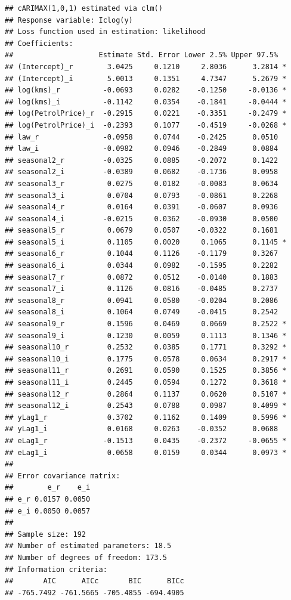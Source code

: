 \documentclass[
]{book}
\begin{document}
\begin{verbatim}
## cARIMAX(1,0,1) estimated via clm()
## Response variable: Iclog(y)
## Loss function used in estimation: likelihood
## Coefficients:
##                    Estimate Std. Error Lower 2.5% Upper 97.5%  
## (Intercept)_r        3.0425     0.1210     2.8036      3.2814 *
## (Intercept)_i        5.0013     0.1351     4.7347      5.2679 *
## log(kms)_r          -0.0693     0.0282    -0.1250     -0.0136 *
## log(kms)_i          -0.1142     0.0354    -0.1841     -0.0444 *
## log(PetrolPrice)_r  -0.2915     0.0221    -0.3351     -0.2479 *
## log(PetrolPrice)_i  -0.2393     0.1077    -0.4519     -0.0268 *
## law_r               -0.0958     0.0744    -0.2425      0.0510  
## law_i               -0.0982     0.0946    -0.2849      0.0884  
## seasonal2_r         -0.0325     0.0885    -0.2072      0.1422  
## seasonal2_i         -0.0389     0.0682    -0.1736      0.0958  
## seasonal3_r          0.0275     0.0182    -0.0083      0.0634  
## seasonal3_i          0.0704     0.0793    -0.0861      0.2268  
## seasonal4_r          0.0164     0.0391    -0.0607      0.0936  
## seasonal4_i         -0.0215     0.0362    -0.0930      0.0500  
## seasonal5_r          0.0679     0.0507    -0.0322      0.1681  
## seasonal5_i          0.1105     0.0020     0.1065      0.1145 *
## seasonal6_r          0.1044     0.1126    -0.1179      0.3267  
## seasonal6_i          0.0344     0.0982    -0.1595      0.2282  
## seasonal7_r          0.0872     0.0512    -0.0140      0.1883  
## seasonal7_i          0.1126     0.0816    -0.0485      0.2737  
## seasonal8_r          0.0941     0.0580    -0.0204      0.2086  
## seasonal8_i          0.1064     0.0749    -0.0415      0.2542  
## seasonal9_r          0.1596     0.0469     0.0669      0.2522 *
## seasonal9_i          0.1230     0.0059     0.1113      0.1346 *
## seasonal10_r         0.2532     0.0385     0.1771      0.3292 *
## seasonal10_i         0.1775     0.0578     0.0634      0.2917 *
## seasonal11_r         0.2691     0.0590     0.1525      0.3856 *
## seasonal11_i         0.2445     0.0594     0.1272      0.3618 *
## seasonal12_r         0.2864     0.1137     0.0620      0.5107 *
## seasonal12_i         0.2543     0.0788     0.0987      0.4099 *
## yLag1_r              0.3702     0.1162     0.1409      0.5996 *
## yLag1_i              0.0168     0.0263    -0.0352      0.0688  
## eLag1_r             -0.1513     0.0435    -0.2372     -0.0655 *
## eLag1_i              0.0658     0.0159     0.0344      0.0973 *
## 
## Error covariance matrix:
##        e_r    e_i
## e_r 0.0157 0.0050
## e_i 0.0050 0.0057
## 
## Sample size: 192
## Number of estimated parameters: 18.5
## Number of degrees of freedom: 173.5
## Information criteria:
##       AIC      AICc       BIC      BICc 
## -765.7492 -761.5665 -705.4855 -694.4905
\end{verbatim}
\end{document}
